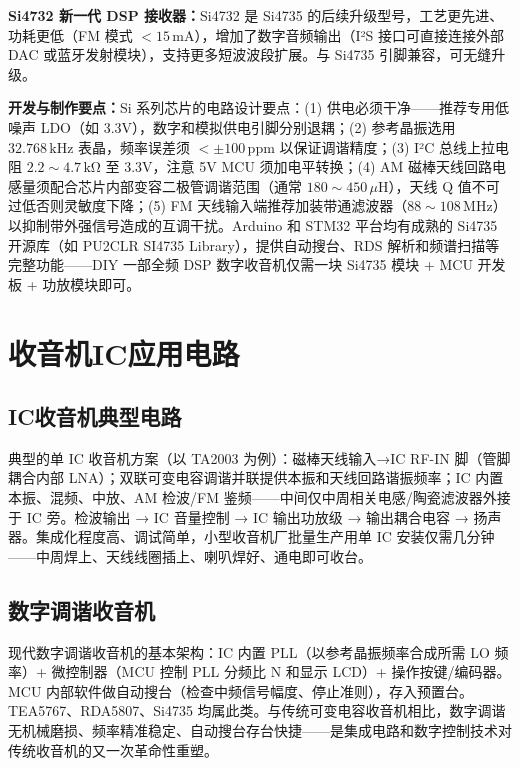 \documentclass[12pt,UTF8]{ctexbook}
\begin{document}
\textbf{Si4732 新一代 DSP 接收器：}Si4732 是 Si4735 的后续升级型号，工艺更先进、功耗更低（FM 模式 $<15\,\mathrm{mA}$），增加了数字音频输出（I²S 接口可直接连接外部 DAC 或蓝牙发射模块），支持更多短波波段扩展。与 Si4735 引脚兼容，可无缝升级。

\textbf{开发与制作要点：}Si 系列芯片的电路设计要点：(1) 供电必须干净——推荐专用低噪声 LDO（如 3.3V），数字和模拟供电引脚分别退耦；(2) 参考晶振选用 $32.768\,\mathrm{kHz}$ 表晶，频率误差须 $<\pm100\,\mathrm{ppm}$ 以保证调谐精度；(3) I²C 总线上拉电阻 $2.2\sim4.7\,\mathrm{k\Omega}$ 至 3.3V，注意 5V MCU 须加电平转换；(4) AM 磁棒天线回路电感量须配合芯片内部变容二极管调谐范围（通常 $180\sim450\,\mu\mathrm{H}$），天线 Q 值不可过低否则灵敏度下降；(5) FM 天线输入端推荐加装带通滤波器（$88\sim108\,\mathrm{MHz}$）以抑制带外强信号造成的互调干扰。Arduino 和 STM32 平台均有成熟的 Si4735 开源库（如 PU2CLR SI4735 Library），提供自动搜台、RDS 解析和频谱扫描等完整功能——DIY 一部全频 DSP 数字收音机仅需一块 Si4735 模块 + MCU 开发板 + 功放模块即可。

\section{收音机IC应用电路}
\label{sec:radio_ic_applications}

\subsection{IC收音机典型电路}

典型的单 IC 收音机方案（以 TA2003 为例）：磁棒天线输入→IC RF-IN 脚（管脚耦合内部 LNA）；双联可变电容调谐并联提供本振和天线回路谐振频率；IC 内置本振、混频、中放、AM 检波/FM 鉴频——中间仅中周相关电感/陶瓷滤波器外接于 IC 旁。检波输出 → IC 音量控制 → IC 输出功放级 → 输出耦合电容 → 扬声器。集成化程度高、调试简单，小型收音机厂批量生产用单 IC 安装仅需几分钟——中周焊上、天线线圈插上、喇叭焊好、通电即可收台。

\subsection{数字调谐收音机}

现代数字调谐收音机的基本架构：IC 内置 PLL（以参考晶振频率合成所需 LO 频率）+ 微控制器（MCU 控制 PLL 分频比 N 和显示 LCD）+ 操作按键/编码器。MCU 内部软件做自动搜台（检查中频信号幅度、停止准则），存入预置台。TEA5767、RDA5807、Si4735 均属此类。与传统可变电容收音机相比，数字调谐无机械磨损、频率精准稳定、自动搜台存台快捷——是集成电路和数字控制技术对传统收音机的又一次革命性重塑。
\end{document}
